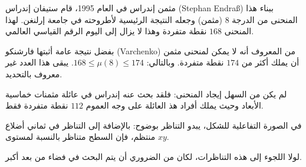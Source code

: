 \begin{surferPage}{مثمن إندراس}
    في العام 1995، قام ستيفان إندراس
    \textenglish{(Stephan Endraß)} ببناء هذا المنحنى من الدرجة $8$ (مثمن) وجعله النتيجة الرئيسية لأطروحته في جامعة إرلنغن.
     لهذا المنحنى $168$ نقطة متفردة وهذا لا يزال إلى اليوم الرقم القياسي العالمي.

     بفضل نتيجة عامة أثبتها فارشنكو
     \textenglish{(Varchenko)}
      من المعروف أنه لا يمكن لمنحنى مثمن أن يملك أكثر من $174$ نقطة متفردة.
    وبالتالي: $168 \le \mu(8) \le 174$.
    يبقى هذا العدد غير معروف بالتحديد.

     لم يكن من السهل إيجاد المنحنى: فلقد بحث عنه إندراس في عائلة مثمنات خماسية الأبعاد وحيث يملك أفراد هذ العائلة على وجه العموم $112$ نقطة متفردة فقط.

    في الصورة التفاعلية للشكل، يبدو التناظر بوضوح:
    بالإضافة إلى التناظر في ثماني أضلاع منتظم، فإن السطح متناظر بالنسبة لمستوى $xy$.

     لولا اللجوء إلى هذه التناظرات، لكان من الضروري أن يتم البحث في فضاء من بعد أكبر.
\end{surferPage}
